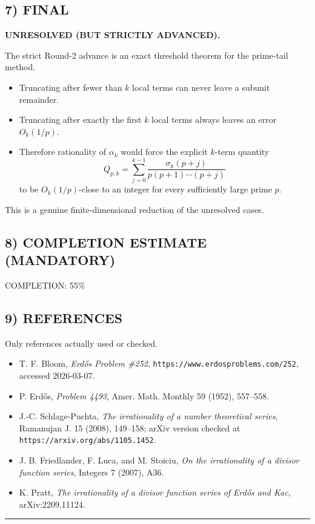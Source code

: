 \subsection*{7) FINAL}
\textbf{UNRESOLVED (BUT STRICTLY ADVANCED).}

The strict Round-2 advance is an exact threshold theorem for the prime-tail method.

\begin{itemize}
\item Truncating after fewer than $k$ local terms can never leave a subunit remainder.
\item Truncating after exactly the first $k$ local terms always leaves an error $O_k(1/p)$.
\item Therefore rationality of $\alpha_k$ would force the explicit $k$-term quantity
\[
Q_{p,k}=\sum_{j=0}^{k-1}\frac{\sigma_k(p+j)}{p(p+1)\cdots(p+j)}
\]
to be $O_k(1/p)$-close to an integer for every sufficiently large prime $p$.
\end{itemize}

This is a genuine finite-dimensional reduction of the unresolved cases.

\subsection*{8) COMPLETION ESTIMATE (MANDATORY)}
COMPLETION: 55\%

\subsection*{9) REFERENCES}
Only references actually used or checked.

\begin{itemize}
\item T. F. Bloom, \emph{Erd\H{o}s Problem \#252}, \texttt{https://www.erdosproblems.com/252}, accessed 2026-03-07.
\item P. Erd\H{o}s, \emph{Problem 4493}, Amer. Math. Monthly 59 (1952), 557--558.
\item J.-C. Schlage-Puchta, \emph{The irrationality of a number theoretical series}, Ramanujan J. 15 (2008), 149--158; arXiv version checked at \texttt{https://arxiv.org/abs/1105.1452}.
\item J. B. Friedlander, F. Luca, and M. Stoiciu, \emph{On the irrationality of a divisor function series}, Integers 7 (2007), A36.
\item K. Pratt, \emph{The irrationality of a divisor function series of Erd\H{o}s and Kac}, arXiv:2209.11124.
\end{itemize}

\bigskip
\hrule
\bigskip


